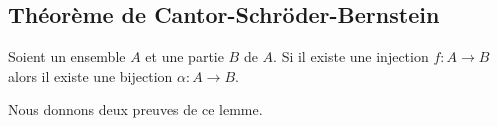 \subsection{Théorème de Cantor-Schröder-Bernstein}

\begin{lemma}     \label{LEMooTNMHooBpdzab}
	Soient un ensemble \( A\) et une partie \( B\) de \( A\). Si il existe une injection \( f\colon A\to B\) alors il existe une bijection \( \alpha\colon A\to B\).
\end{lemma}

Nous donnons deux preuves de ce lemme.

